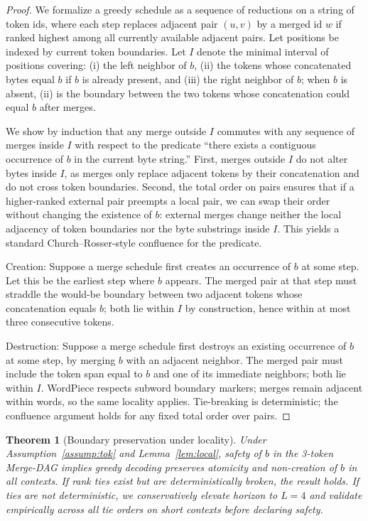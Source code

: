 \documentclass{article}
\newtheorem{theorem}{Theorem}
\begin{document}
\begin{proof}
We formalize a greedy schedule as a sequence of reductions on a string of token ids, where each step replaces adjacent pair $(u,v)$ by a merged id $w$ if ranked highest among all currently available adjacent pairs. Let positions be indexed by current token boundaries. Let $I$ denote the minimal interval of positions covering: (i) the left neighbor of $b$, (ii) the tokens whose concatenated bytes equal $b$ if $b$ is already present, and (iii) the right neighbor of $b$; when $b$ is absent, (ii) is the boundary between the two tokens whose concatenation could equal $b$ after merges.

We show by induction that any merge outside $I$ commutes with any sequence of merges inside $I$ with respect to the predicate “there exists a contiguous occurrence of $b$ in the current byte string.” First, merges outside $I$ do not alter bytes inside $I$, as merges only replace adjacent tokens by their concatenation and do not cross token boundaries. Second, the total order on pairs ensures that if a higher-ranked external pair preempts a local pair, we can swap their order without changing the existence of $b$: external merges change neither the local adjacency of token boundaries nor the byte substrings inside $I$. This yields a standard Church–Rosser-style confluence for the predicate.

Creation: Suppose a merge schedule first creates an occurrence of $b$ at some step. Let this be the earliest step where $b$ appears. The merged pair at that step must straddle the would-be boundary between two adjacent tokens whose concatenation equals $b$; both lie within $I$ by construction, hence within at most three consecutive tokens.

Destruction: Suppose a merge schedule first destroys an existing occurrence of $b$ at some step, by merging $b$ with an adjacent neighbor. The merged pair must include the token span equal to $b$ and one of its immediate neighbors; both lie within $I$. WordPiece respects subword boundary markers; merges remain adjacent within words, so the same locality applies. Tie-breaking is deterministic; the confluence argument holds for any fixed total order over pairs.
\end{proof}

\begin{theorem}[Boundary preservation under locality]\label{thm:bpe}
Under Assumption~\ref{assump:tok} and Lemma~\ref{lem:local}, safety of $b$ in the 3-token Merge-DAG implies greedy decoding preserves atomicity and non-creation of $b$ in all contexts. If rank ties exist but are deterministically broken, the result holds. If ties are not deterministic, we conservatively elevate horizon to $L=4$ and validate empirically across all tie orders on short contexts before declaring safety.
\end{theorem}
\end{document}
